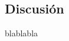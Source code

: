 \documentclass[conference,spanish,a4paper,10pt,oneside,final]{tfmpd}
\begin{document}
\subsection{Discusión}
blablabla
%
%
%
%
%
%
%

\end{document}
